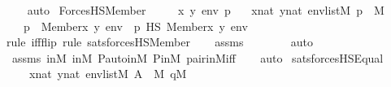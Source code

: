 \begin{isabellebody}
\ \ \isamarkupfalse%
\ auto%
\endisatagproof
{\isafoldproof}%
%
\isadelimproof
\isanewline
%
\endisadelimproof
\isanewline
{}\isamarkupfalse%
\ ForcesHS{\isacharunderscore}{\kern0pt}Member\ {\isacharcolon}{\kern0pt}\ \isanewline
\ \ \ x\ y\ env\ p\isanewline
\ \ \ {\isachardoublequoteopen}x{\isasymin}nat{\isachardoublequoteclose}\ {\isachardoublequoteopen}y{\isasymin}nat{\isachardoublequoteclose}\ {\isachardoublequoteopen}env{\isasymin}list{\isacharparenleft}{\kern0pt}M{\isacharparenright}{\kern0pt}{\isachardoublequoteclose}\ {\isachardoublequoteopen}p\ {\isasymin}\ M{\isachardoublequoteclose}\isanewline
\ \ \ {\isachardoublequoteopen}p\ {\isasymtturnstile}\ Member{\isacharparenleft}{\kern0pt}x{\isacharcomma}{\kern0pt}\ y{\isacharparenright}{\kern0pt}\ env\ {\isasymlongleftrightarrow}\ p\ {\isasymtturnstile}HS\ Member{\isacharparenleft}{\kern0pt}x{\isacharcomma}{\kern0pt}\ y{\isacharparenright}{\kern0pt}\ env{\isachardoublequoteclose}\ \isanewline
%
\isadelimproof
\ \ %
\endisadelimproof
%
\isatagproof
{}\isamarkupfalse%
{\isacharparenleft}{\kern0pt}rule\ iff{\isacharunderscore}{\kern0pt}flip{\isacharcomma}{\kern0pt}\ rule\ sats{\isacharunderscore}{\kern0pt}forcesHS{\isacharunderscore}{\kern0pt}Member{\isacharparenright}{\kern0pt}\isanewline
\ \ \isamarkupfalse%
\ assms\isanewline
\ \ \ \ \ \ \isamarkupfalse%
\ auto{\isacharbrackleft}{\kern0pt}{}{\isacharbrackright}{\kern0pt}\isanewline
\ \ \isamarkupfalse%
\ assms\ {\isasymF}{\isacharunderscore}{\kern0pt}in{\isacharunderscore}{\kern0pt}M\ {\isasymG}{\isacharunderscore}{\kern0pt}in{\isacharunderscore}{\kern0pt}M\ P{\isacharunderscore}{\kern0pt}auto{\isacharunderscore}{\kern0pt}in{\isacharunderscore}{\kern0pt}M\ P{\isacharunderscore}{\kern0pt}in{\isacharunderscore}{\kern0pt}M\ pair{\isacharunderscore}{\kern0pt}in{\isacharunderscore}{\kern0pt}M{\isacharunderscore}{\kern0pt}iff\isanewline
\ \ \isamarkupfalse%
\ auto%
\endisatagproof
{\isafoldproof}%
%
\isadelimproof
\isanewline
%
\endisadelimproof
\isanewline
{}\isamarkupfalse%
\ sats{\isacharunderscore}{\kern0pt}forcesHS{\isacharunderscore}{\kern0pt}Equal\ {\isacharcolon}{\kern0pt}\isanewline
\ \ \ \ {\isachardoublequoteopen}x{\isasymin}nat{\isachardoublequoteclose}\ {\isachardoublequoteopen}y{\isasymin}nat{\isachardoublequoteclose}\ {\isachardoublequoteopen}env{\isasymin}list{\isacharparenleft}{\kern0pt}M{\isacharparenright}{\kern0pt}{\isachardoublequoteclose}\ {\isachardoublequoteopen}A\ {\isasymin}\ M{\isachardoublequoteclose}\ {\isachardoublequoteopen}q{\isasymin}M{\isachardoublequoteclose}\isanewline

\end{isabellebody}
